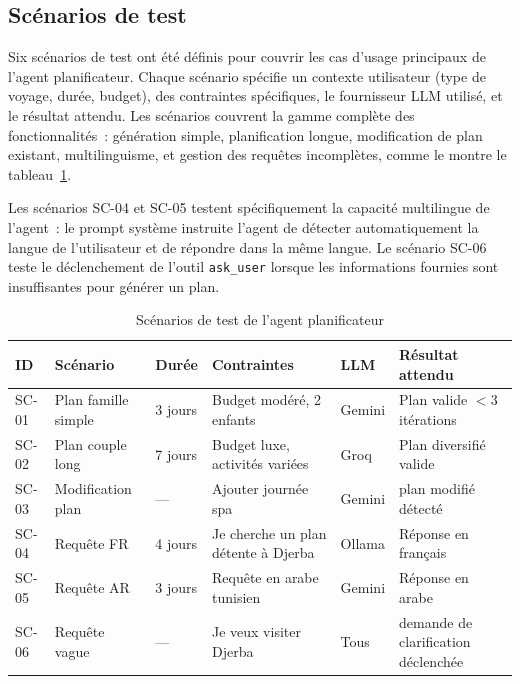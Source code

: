 \subsection{Scénarios de test}

Six scénarios de test ont été définis pour couvrir les cas d'usage principaux de l'agent
planificateur. Chaque scénario spécifie un contexte utilisateur (type de voyage, durée,
budget), des contraintes spécifiques, le fournisseur LLM utilisé, et le résultat attendu.
Les scénarios couvrent la gamme complète des fonctionnalités~: génération simple, planification
longue, modification de plan existant, multilinguisme, et gestion des requêtes incomplètes, comme le montre le tableau~\ref{tab:test_scenarios}.

Les scénarios SC-04 et SC-05 testent spécifiquement la capacité multilingue de l'agent~:
le prompt système instruite l'agent de détecter automatiquement la langue de l'utilisateur et
de répondre dans la même langue. Le scénario SC-06 teste le déclenchement de l'outil
\texttt{ask\_user} lorsque les informations fournies sont insuffisantes pour générer un plan.

\begin{table}[H]
    \centering
    \caption{Scénarios de test de l'agent planificateur}
    \label{tab:test_scenarios}
    \footnotesize
    \begin{tabular}{p{0.8cm} p{2.8cm} p{1.2cm} p{2.8cm} p{1.5cm} p{3.5cm}}
        \toprule
        \textbf{ID} & \textbf{Scénario} & \textbf{Durée} & \textbf{Contraintes} &
        \textbf{LLM} & \textbf{Résultat attendu} \\
        \midrule
        SC-01 & Plan famille simple & 3 jours & Budget modéré, 2 enfants &
                Gemini & Plan valide $<3$ itérations \\[2pt]
        SC-02 & Plan couple long & 7 jours & Budget luxe, activités variées &
                Groq & Plan diversifié valide \\[2pt]
        SC-03 & Modification plan & — & Ajouter journée spa &
                Gemini & plan modifié détecté \\[2pt]
        SC-04 & Requête FR & 4 jours & \og{}Je cherche un plan détente à Djerba\fg{} &
                Ollama & Réponse en français \\[2pt]
        SC-05 & Requête AR & 3 jours & Requête en arabe tunisien &
                Gemini & Réponse en arabe \\[2pt]
        SC-06 & Requête vague & — & \og{}Je veux visiter Djerba\fg{} &
                Tous & demande de clarification déclenchée \\
        \bottomrule
    \end{tabular}
\end{table}


